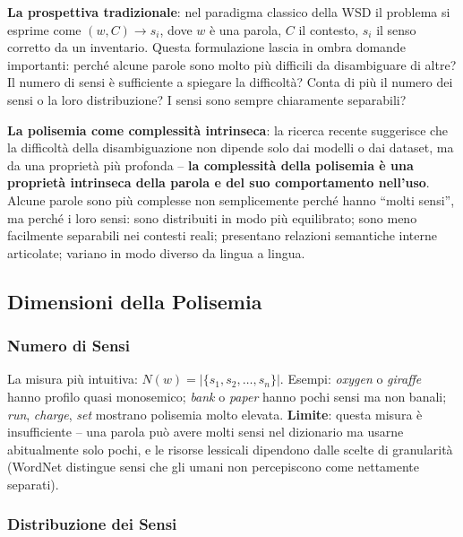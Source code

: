 \documentclass[12pt,a4paper]{article}
\begin{document}
\textbf{La prospettiva tradizionale}: nel paradigma classico della WSD il problema si esprime come $(w, C) \longrightarrow s_i$, dove $w$ \`e una parola, $C$ il contesto, $s_i$ il senso corretto da un inventario. Questa formulazione lascia in ombra domande importanti: perch\'e alcune parole sono molto pi\`u difficili da disambiguare di altre? Il numero di sensi \`e sufficiente a spiegare la difficolt\`a? Conta di pi\`u il numero dei sensi o la loro distribuzione? I sensi sono sempre chiaramente separabili?

\begin{defbox}
\textbf{La polisemia come complessit\`a intrinseca}: la ricerca recente suggerisce che la difficolt\`a della disambiguazione non dipende solo dai modelli o dai dataset, ma da una propriet\`a pi\`u profonda -- \textbf{la complessit\`a della polisemia \`e una propriet\`a intrinseca della parola e del suo comportamento nell'uso}. Alcune parole sono pi\`u complesse non semplicemente perch\'e hanno ``molti sensi'', ma perch\'e i loro sensi: sono distribuiti in modo pi\`u equilibrato; sono meno facilmente separabili nei contesti reali; presentano relazioni semantiche interne articolate; variano in modo diverso da lingua a lingua.
\end{defbox}

\subsection{Dimensioni della Polisemia}

\subsubsection{Numero di Sensi}

La misura pi\`u intuitiva: $N(w) = |\{s_1, s_2, \dots, s_n\}|$. Esempi: \textit{oxygen} o \textit{giraffe} hanno profilo quasi monosemico; \textit{bank} o \textit{paper} hanno pochi sensi ma non banali; \textit{run}, \textit{charge}, \textit{set} mostrano polisemia molto elevata. \textbf{Limite}: questa misura \`e insufficiente -- una parola pu\`o avere molti sensi nel dizionario ma usarne abitualmente solo pochi, e le risorse lessicali dipendono dalle scelte di granularit\`a (WordNet distingue sensi che gli umani non percepiscono come nettamente separati).

\subsubsection{Distribuzione dei Sensi}
\end{document}
